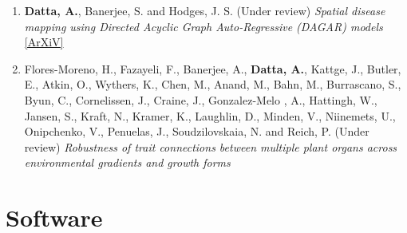 \documentclass[11pt,a4paper,sans]{moderncv} %
\begin{document}
{\begin{enumerate}
\item \vskip 4mm \textbf{Datta, A.}, Banerjee, S. and Hodges, J. S. (Under review) {\em Spatial disease mapping using Directed Acyclic Graph Auto-Regressive (DAGAR) models} \href{https://arxiv.org/pdf/1704.07848.pdf}{[ArXiV]}

\item \vskip 2mm Flores-Moreno, H.,   Fazayeli, F.,   Banerjee, A.,   \textbf{Datta, A.},   Kattge, J.,   Butler, E.,   Atkin, O.,   Wythers, K.,   Chen, M.,   Anand, M.,   Bahn, M.,   Burrascano, S.,   Byun, C.,   Cornelissen, J.,   Craine, J.,   Gonzalez-Melo , A.,   Hattingh, W.,   Jansen, S.,   Kraft, N.,   Kramer, K.,   Laughlin, D.,   Minden, V.,  Niinemets, U.,   Onipchenko, V., Penuelas, J.,   Soudzilovskaia, N.   and   Reich, P. (Under review) {\em Robustness of trait connections between multiple plant organs across environmental gradients and growth forms}

%
%
%
%
%

\end{enumerate}

\section{Software}

}
\end{document}
